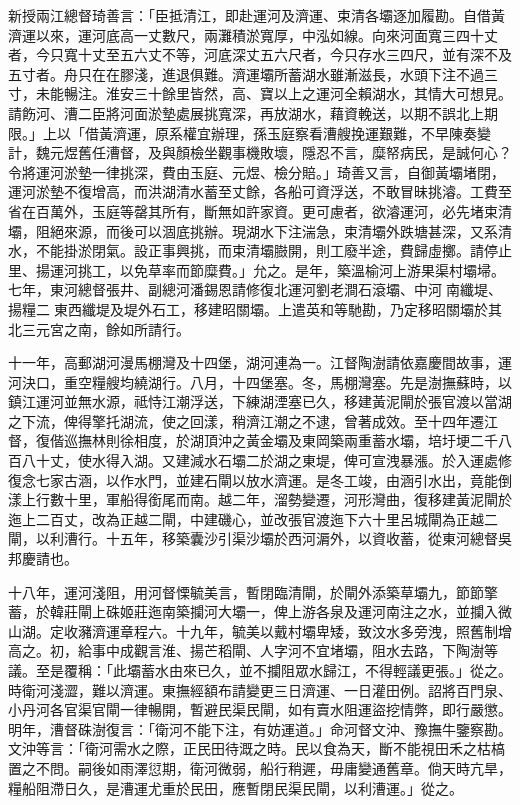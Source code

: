 \begin{pinyinscope}
新授兩江總督琦善言：「臣抵清江，即赴運河及濟運、束清各壩逐加履勘。自借黃濟運以來，運河底高一丈數尺，兩灘積淤寬厚，中泓如線。向來河面寬三四十丈者，今只寬十丈至五六丈不等，河底深丈五六尺者，今只存水三四尺，並有深不及五寸者。舟只在在膠淺，進退俱難。濟運壩所蓄湖水雖漸滋長，水頭下注不過三寸，未能暢注。淮安三十餘里皆然，高、寶以上之運河全賴湖水，其情大可想見。請飭河、漕二臣將河面淤墊處展挑寬深，再放湖水，藉資輓送，以期不誤北上期限。」上以「借黃濟運，原系權宜辦理，孫玉庭察看漕艘挽運艱難，不早陳奏變計，魏元煜舊任漕督，及與顏檢坐觀事機敗壞，隱忍不言，糜帑病民，是誠何心？令將運河淤墊一律挑深，費由玉庭、元煜、檢分賠。」琦善又言，自御黃壩堵閉，運河淤墊不復增高，而洪湖清水蓄至丈餘，各船可資浮送，不敢冒昧挑濬。工費至省在百萬外，玉庭等罄其所有，斷無如許家資。更可慮者，欲濬運河，必先堵束清壩，阻絕來源，而後可以涸底挑辦。現湖水下注湍急，束清壩外跌塘甚深，又系清水，不能掛淤閉氣。設正事興挑，而束清壩臌開，則工廢半途，費歸虛擲。請停止里、揚運河挑工，以免草率而節糜費。」允之。是年，築溫榆河上游果渠村壩埽。七年，東河總督張井、副總河潘錫恩請修復北運河劉老澗石滾壩、中河南纖堤、揚糧二東西纖堤及堤外石工，移建昭關壩。上遣英和等馳勘，乃定移昭關壩於其北三元宮之南，餘如所請行。

十一年，高郵湖河漫馬棚灣及十四堡，湖河連為一。江督陶澍請依嘉慶間故事，運河決口，重空糧艘均繞湖行。八月，十四堡塞。冬，馬棚灣塞。先是澍撫蘇時，以鎮江運河並無水源，祗恃江潮浮送，下練湖湮塞已久，移建黃泥閘於張官渡以當湖之下流，俾得擎托湖流，使之回漾，稍濟江潮之不逮，曾著成效。至十四年遷江督，復偕巡撫林則徐相度，於湖頂沖之黃金壩及東岡築兩重蓄水壩，培圩埂二千八百八十丈，使水得入湖。又建減水石壩二於湖之東堤，俾可宣洩暴漲。於入運處修復念七家古涵，以作水門，並建石閘以放水濟運。是冬工竣，由涵引水出，竟能倒漾上行數十里，軍船得銜尾而南。越二年，溜勢變遷，河形灣曲，復移建黃泥閘於迤上二百丈，改為正越二閘，中建磯心，並改張官渡迤下六十里呂城閘為正越二閘，以利漕行。十五年，移築囊沙引渠沙壩於西河漘外，以資收蓄，從東河總督吳邦慶請也。

十八年，運河淺阻，用河督慄毓美言，暫閉臨清閘，於閘外添築草壩九，節節擎蓄，於韓莊閘上硃姬莊迤南築攔河大壩一，俾上游各泉及運河南注之水，並攔入微山湖。定收瀦濟運章程六。十九年，毓美以戴村壩卑矮，致汶水多旁洩，照舊制增高之。初，給事中成觀言淮、揚芒稻閘、人字河不宜堵壩，阻水去路，下陶澍等議。至是覆稱：「此壩蓄水由來已久，並不攔阻眾水歸江，不得輕議更張。」從之。時衛河淺澀，難以濟運。東撫經額布請變更三日濟運、一日灌田例。詔將百門泉、小丹河各官渠官閘一律暢開，暫避民渠民閘，如有賣水阻運盜挖情弊，即行嚴懲。明年，漕督硃澍復言：「衛河不能下注，有妨運道。」命河督文沖、豫撫牛鑒察勘。文沖等言：「衛河需水之際，正民田待溉之時。民以食為天，斷不能視田禾之枯槁置之不問。嗣後如雨澤愆期，衛河微弱，船行稍遲，毋庸變通舊章。倘天時亢旱，糧船阻滯日久，是漕運尤重於民田，應暫閉民渠民閘，以利漕運。」從之。


\end{pinyinscope}
